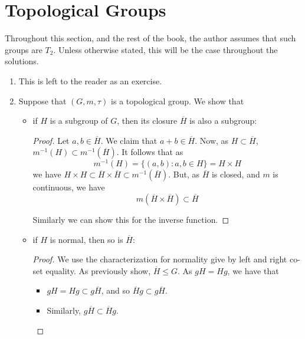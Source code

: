 \documentclass{book}
\begin{document}
\section{Topological Groups}
Throughout this section, and the rest of the book, the author assumes that such groups are $T_2$. Unless otherwise stated, this will be the case throughout the solutions.  
\begin{enumerate}[(1)]

    \item This is left to the reader as an exercise.

    \item Suppose that $(G, m, \tau)$ is a topological group. We show that 
        \begin{itemize}
            \item if $H$ is a subgroup of $G$, then its closure $\overline{H}$ is also a subgroup: 
                \begin{proof} Let $a,b \in \overline{H}$. We claim that $a + b \in \overline{H}$. Now, as $H \subset \overline{H}$, $m^{-1}(H) \subset m^{-1}(\overline{H})$. It follows that as 
                    \[m^{-1}(H) = \{(a,b) : a,b \in H\} = H \times H\]
                    we have $H \times H \subset \overline{H} \times \overline{H} 
                    \subset m^{-1}(\overline{H})$. But, as $\overline{H}$ is closed, and $m$ is continuous, we have 
                    \[m(\overline{H} \times \overline{H}) \subset \overline{H}\]
                    \par Similarly we can show this for the inverse function.
                \end{proof}

            \item if $H$ is normal, then so is $\overline{H}$: 
                \begin{proof} We use the characterization for normality give by left and right co-set equality. As previously show, $\overline{H} \leq G$. As $gH = Hg$, we have that 
                    \begin{itemize}
                        \item $gH = Hg \subset g\overline{H}$, and so $\overline{H}g \subset g \overline{H}$.
                        \item Similarly, $g\overline{H} \subset \overline{H}g$.
                    \end{itemize}
                \end{proof}
        \end{itemize}


\end{enumerate}
\end{document}
